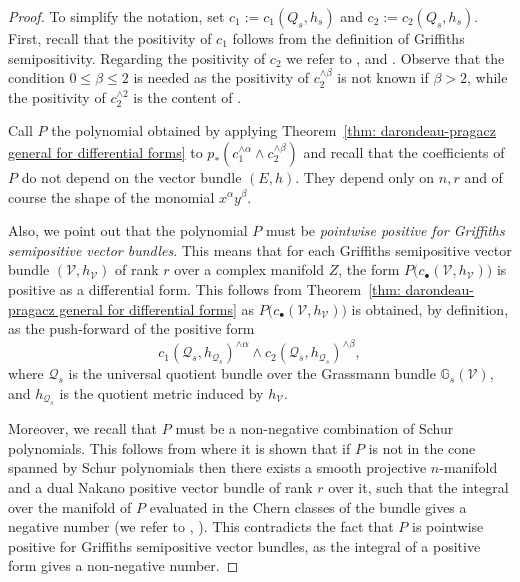 \documentclass[a4paper]{amsart}
\theoremstyle{plain}%
\theoremstyle{definition}
\theoremstyle{remark}
\newcommand{\GG}{\mathbb{G}}
\begin{document}
\begin{proof}
	To simplify the notation, set $ c_1 := c_1(Q_s,h_s) $ and $ c_2 := c_2(Q_s,h_s) $.
	First, recall that the positivity of $ c_1 $ follows from the definition of Griffiths semipositivity.
	Regarding the positivity of $ c_2 $ we refer to \cite[Appendix to~\S 5.(b)]{Gri69}, \cite[6]{Gul06} and \cite[Theorem~{2.2}]{Fag20}.
	Observe that the condition $ 0 \le \beta \le 2 $ is needed as the positivity of $ c_2^{\wedge \beta} $ is not known if $ \beta > 2 $, while the positivity of $ c_2^{\wedge 2} $ is the content of \cite[Theorem~1]{BP13}.
	
	Call $ P $ the polynomial obtained by applying Theorem~\ref{thm: darondeau-pragacz general for differential forms} to $ p_{*} ( c_1^{\wedge \alpha} \wedge  c_2^{\wedge \beta} )$ and recall that the coefficients of $ P $ do not depend on the vector bundle $ (E,h) $.
	They depend only on $ n, r $ and of course the shape of the monomial $ x^{\alpha}  y^{\beta} $.
	
	Also, we point out that the polynomial $ P $ must be \emph{pointwise positive for Griffiths semipositive vector bundles}.
	This means that for each Griffiths semipositive vector bundle $ (\mathcal{V},h_{\mathcal{V}}) $ of rank $ r $ over a complex manifold $ Z $, the form $ P\big( c_{\bullet}(\mathcal{V},h_{\mathcal{V}}) \big) $ is positive as a differential form.
	This follows from Theorem~\ref{thm: darondeau-pragacz general for differential forms} as $ P\big( c_{\bullet}(\mathcal{V},h_{\mathcal{V}}) \big) $ is obtained, by definition, as the push-forward of the positive form
	\[
	{c_1(\mathcal{Q}_s,h_{\mathcal{Q}_s})}^{\wedge \alpha} \wedge {c_2(\mathcal{Q}_s,h_{\mathcal{Q}_s})}^{\wedge \beta} ,
	\]
	where $ \mathcal{Q}_s $ is the universal quotient bundle over the Grassmann bundle $ \GG_{s}(\mathcal{V}) $, and $ h_{\mathcal{Q}_s} $ is the quotient metric induced by $ h_{\mathcal{V}} $.
	
	Moreover, we recall that $ P $ must be a non-negative combination of Schur polynomials.
	This follows from \cite[Proposition~{3.4}]{FL83} where it is shown that if $ P $ is not in the cone spanned by Schur polynomials then there exists a smooth projective $ n $-manifold and a dual Nakano positive vector bundle of rank $ r $ over it, such that the integral over the manifold of $ P $ evaluated in the Chern classes of the bundle gives a negative number (we refer to \cite[Appendix~A]{FL83}, \cite[Remark~{4.4}]{DF20}).
	This contradicts the fact that $ P $ is pointwise positive for Griffiths semipositive vector bundles, as the integral of a positive form gives a non-negative number.
\end{proof}
\end{document}
